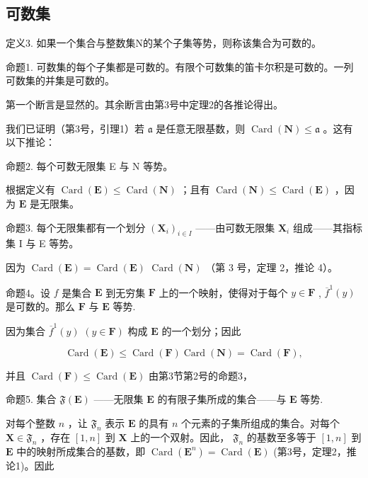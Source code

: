 \subsection{可数集}

定义3. 如果一个集合与整数集N的某个子集等势，则称该集合为可数的。

命题1. 可数集的每个子集都是可数的。有限个可数集的笛卡尔积是可数的。一列可数集的并集是可数的。

第一个断言是显然的。其余断言由第3号中定理2的各推论得出。

我们已证明（第3号，引理1）若 \(\mathfrak{a}\) 是任意无限基数，则 \(\operatorname{Card}(\mathbf{N}) \leqslant \mathfrak{a}\) 。这有以下推论：

命题2. 每个可数无限集 E 与 N 等势。

根据定义有 \(\operatorname{Card}(\mathbf{E}) \leqslant \operatorname{Card}(\mathbf{N})\) ；且有 \(\operatorname{Card}(\mathbf{N}) \leqslant \operatorname{Card}(\mathbf{E})\) ，因为 \(\mathbf{E}\) 是无限集。

命题3. 每个无限集都有一个划分 \((\mathbf{X}_i)_{i\in I}\) ——由可数无限集 \(\mathbf{X}_i\) 组成——其指标集 I 与 E 等势。

因为 \(\operatorname{Card}(\mathbf{E}) = \operatorname{Card}(\mathbf{E})\) \(\operatorname{Card}(\mathbf{N})\) （第 3 号，定理 2，推论 4）。

命题4。设 \(f\) 是集合 \(\mathbf{E}\) 到无穷集 \(\mathbf{F}\) 上的一个映射，使得对于每个 \(y \in \mathbf{F}\) , \(\overline{f}^1(y)\) 是可数的。那么 \(\mathbf{F}\) 与 \(\mathbf{E}\) 等势.

因为集合 \(\overline{f}^1 (y)\) \((y\in \mathbf{F})\) 构成 \(\mathbf{E}\) 的一个划分；因此

\[
\operatorname{Card} (\mathbf {E}) \leqslant \operatorname{Card} (\mathbf {F}) \operatorname{Card} (\mathbf {N}) = \operatorname{Card} (\mathbf {F}),
\]

并且 \(\operatorname{Card}(\mathbf{F}) \leqslant \operatorname{Card}(\mathbf{E})\) 由第3节第2号的命题3，

命题5. 集合 \(\mathfrak{F}(\mathbf{E})\) ——无限集 \(\mathbf{E}\) 的有限子集所成的集合——与 \(\mathbf{E}\) 等势.

对每个整数 \(n\) ，让 \(\mathfrak{F}_n\) 表示 \(\mathbf{E}\) 的具有 \(n\) 个元素的子集所组成的集合。对每个 \(\mathbf{X} \in \mathfrak{F}_n\) ，存在 \([1, n]\) 到 \(\mathbf{X}\) 上的一个双射。因此， \(\mathfrak{F}_n\) 的基数至多等于 \([1, n]\) 到 \(\mathbf{E}\) 中的映射所成集合的基数，即 \(\operatorname{Card}(\mathbf{E}^n) = \operatorname{Card}(\mathbf{E})\) (第3号，定理2，推论1)。因此

